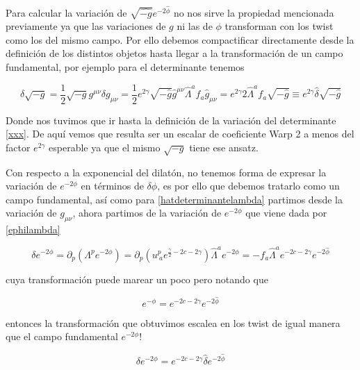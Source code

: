 \documentclass{article}
\numberwithin{equation}{section}
\begin{document}
Para calcular la variación de $ \sqrt{\hat{-g}}e^{-2\hat{\phi}} $ no nos sirve la propiedad mencionada previamente ya que las variaciones de $ g $ ni las de $ \phi $ transforman con los twist como los del mismo campo. Por ello debemos compactificar directamente desde la definición de los distintos objetos hasta llegar a la transformación de un campo fundamental, por ejemplo para el determinante tenemos

\begin{equation}\label{hatdeterminantelambda}
\delta \sqrt{-g} = \frac{1}{2} \sqrt{-g} g^{\mu \nu} \delta g_{\mu \nu} = \frac{1}{2} e^{2 \gamma} \sqrt{-\hat{g}} \hat{g}^{\mu \nu} \hat{\Lambda}^a f_a \hat{g}_{\mu \nu} = e^{2 \gamma} 2 \hat{\Lambda}^a f_a \sqrt{-\hat{g}} \equiv e^{2 \gamma} \hat{\delta} \sqrt{-\hat{g}}
\end{equation}

Donde nos tuvimos que ir hasta la definición de la variación del determinante \ref{xxx}. De aquí vemos que resulta ser un escalar de coeficiente Warp 2 a menos del factor $ e^{2 \gamma} $ esperable ya que el mismo $ \sqrt{-g} $ tiene ese ansatz.

Con respecto a la exponencial del dilatón, no tenemos forma de expresar la variación de $ e^{-2\phi} $ en términos de $ \delta \phi $, es por ello que debemos tratarlo como un campo fundamental, así como para \ref{hatdeterminantelambda} partimos desde la variación de $ g_{\mu \nu} $, ahora partimos de la variación de $ e^{-2\phi} $ que viene dada por \ref{ephilambda}

\begin{equation}
\delta e^{-2 \phi} = \partial_p \left( \Lambda^p e^{-2\phi} \right) = \partial_p \left( u^{p}_{\ a} e^{\frac{\gamma}{2} -2c -2\gamma} \right) \hat{\Lambda}^a e^{-2 \hat{\phi}} = - f_a \hat{\Lambda}^a e^{-2c -2\gamma} e^{-2 \hat{\phi}}
\end{equation}

cuya transformación puede marear un poco pero notando que

\begin{equation}
e^{- \phi} = e^{-2c -2\gamma} e^{-2 \hat{\phi}}
\end{equation}

entonces la transformación que obtuvimos escalea en los twist de igual manera que el campo fundamental $ e^{-2 \phi} $!

\begin{equation}
\delta e^{-2 \phi} = e^{-2c -2\gamma} \hat{\delta} e^{-2 \hat{\phi}}
\end{equation}
\end{document}
